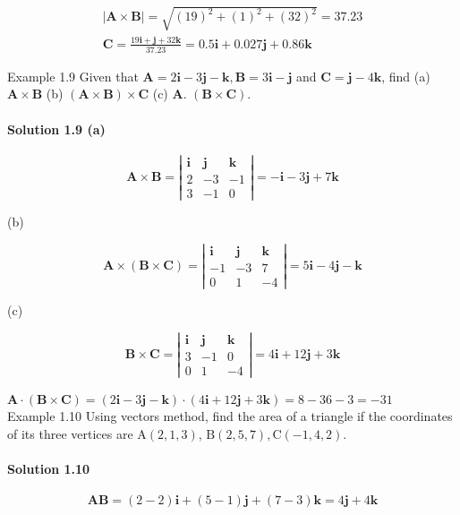\documentclass[10pt]{article}
\numberwithin{equation}{section}
\begin{document}
$$
\begin{gathered}
|\mathbf{A} \times \mathbf{B}|=\sqrt{(19)^{2}+(1)^{2}+(32)^{2}}=37.23 \\
\mathbf{C}=\frac{19 \mathbf{i}+\mathbf{j}+32 \mathbf{k}}{37.23}=0.5 \mathbf{i}+0.027 \mathbf{j}+0.86 \mathbf{k}
\end{gathered}
$$

Example 1.9 Given that $\mathbf{A}=2 \mathbf{i}-3 \mathbf{j}-\mathbf{k}, \mathbf{B}=3 \mathbf{i}-\mathbf{j}$ and $\mathbf{C}=\mathbf{j}-4 \mathbf{k}$, find (a) $\mathbf{A} \times \mathbf{B}$ (b) $(\mathbf{A} \times \mathbf{B}) \times \mathbf{C}$ (c) $\mathbf{A}$. $(\mathbf{B} \times \mathbf{C})$.

\paragraph*{Solution 1.9 (a)}
$$
\mathbf{A} \times \mathbf{B}=\left|\begin{array}{lll}
\mathbf{i} & \mathbf{j} & \mathbf{k} \\
2 & -3 & -1 \\
3 & -1 & 0
\end{array}\right|=-\mathbf{i}-3 \mathbf{j}+7 \mathbf{k}
$$

(b)

$$
\mathbf{A} \times(\mathbf{B} \times \mathbf{C})=\left|\begin{array}{lll}
\mathbf{i} & \mathbf{j} & \mathbf{k} \\
-1 & -3 & 7 \\
0 & 1 & -4
\end{array}\right|=5 \mathbf{i}-4 \mathbf{j}-\mathbf{k}
$$

(c)

$$
\mathbf{B} \times \mathbf{C}=\left|\begin{array}{lll}
\mathbf{i} & \mathbf{j} & \mathbf{k} \\
3 & -1 & 0 \\
0 & 1 & -4
\end{array}\right|=4 \mathbf{i}+12 \mathbf{j}+3 \mathbf{k}
$$

$\mathbf{A} \cdot(\mathbf{B} \times \mathbf{C})=(2 \mathbf{i}-3 \mathbf{j}-\mathbf{k}) \cdot(4 \mathbf{i}+12 \mathbf{j}+3 \mathbf{k})=8-36-3=-31$\\
Example 1.10 Using vectors method, find the area of a triangle if the coordinates of its three vertices are $\mathrm{A}(2,1,3)$, $\mathrm{B}(2,5,7), \mathrm{C}(-1,4,2)$.

\paragraph*{Solution 1.10}
$$
\mathbf{A B}=(2-2) \mathbf{i}+(5-1) \mathbf{j}+(7-3) \mathbf{k}=4 \mathbf{j}+4 \mathbf{k}
$$
\end{document}
